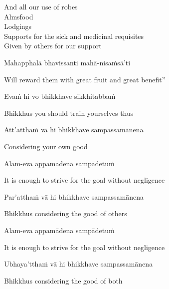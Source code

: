 \begin{english-verses}
  And all our use of robes\\
  Almsfood\\
  Lodgings\\
  Supports for the sick and medicinal requisites\makeatletter\hyperlink{endnote92-appendix}\makeatother\\
  Given by others for our support
\end{english-verses}

Mahapphalā bhavissanti mahā-nisaṁsā'ti

\begin{english}
  Will reward them with great fruit and great benefit''
\end{english}

Evaṁ hi vo bhikkhave sikkhitabbaṁ

\begin{english}
  Bhikkhus you should train yourselves thus
\end{english}

Att'atthaṁ vā hi bhikkhave sampassamānena

\begin{english}
  Considering your own good
\end{english}

Alam-eva appamādena sampādetuṁ

\begin{english}
  It is enough to strive for the goal without negligence
\end{english}

Par'atthaṁ vā hi bhikkhave sampassamānena

\begin{english}
  Bhikkhus considering the good of others
\end{english}

Alam-eva appamādena sampādetuṁ

\begin{english}
  It is enough to strive for the goal without negligence
\end{english}

Ubhaya'tthaṁ vā hi bhikkhave sampassamānena

\begin{english}
  Bhikkhus considering the good of both
\end{english}

